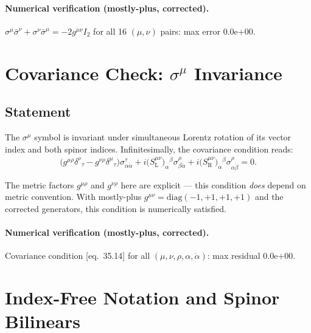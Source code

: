 \documentclass[12pt]{article}
\newcommand{\verified}[1]{\textcolor{verifygreen}{\checkmark\; #1}}
\begin{document}
\paragraph{Numerical verification (mostly-plus, corrected).}
\verified{$\sigma^\mu\bar\sigma^\nu + \sigma^\nu\bar\sigma^\mu = -2g^{\mu\nu}I_2$ for all 16 $(\mu,\nu)$ pairs: max error $0.0$\textrm{e}$+00$.}

\section{Covariance Check: \texorpdfstring{$\sigma^\mu$}{sigma\^{}mu}
         Invariance \quad [eq.~35.14]}

\subsection{Statement}

The $\sigma^\mu$ symbol is invariant under simultaneous Lorentz
rotation of its vector index and both spinor indices.
Infinitesimally, the covariance condition reads:
\begin{equation}
  \bigl(g^{\mu\rho}\delta^{\nu}{}_\tau - g^{\nu\rho}\delta^{\mu}{}_\tau\bigr)
  \sigma^\tau_{\alpha\dot\alpha}
  + i\bigl(S^{\mu\nu}_{\mathrm{L}}\bigr)_\alpha{}^\beta
    \sigma^\rho_{\beta\dot\alpha}
  + i\bigl(S^{\mu\nu}_{\mathrm{R}}\bigr)_{\dot\alpha}{}^{\dot\beta}
    \sigma^\rho_{\alpha\dot\beta}
  = 0.
  \tag{35.14}
\end{equation}

The metric factors $g^{\mu\rho}$ and $g^{\nu\rho}$ here are explicit
--- this condition \emph{does} depend on metric convention.
With mostly-plus $g^{\mu\nu}=\mathrm{diag}(-1,+1,+1,+1)$ and the
corrected generators, this condition is numerically satisfied.

\paragraph{Numerical verification (mostly-plus, corrected).}
\verified{Covariance condition [eq.~35.14] for all $(\mu,\nu,\rho,\alpha,\dot\alpha)$: max residual $0.0$\textrm{e}$+00$.}

\section{Index-Free Notation and Spinor Bilinears \quad [eq.~35.23--35.29]}
\end{document}

